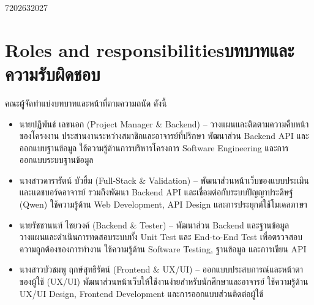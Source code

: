 \label{tab:ch1-plan}
\nopagebreak
\begin{plan}{7}{2026}{3}{2027}
\end{plan}

\section{\ifenglish Roles and responsibilities\else บทบาทและความรับผิดชอบ\fi}

คณะผู้จัดทำแบ่งบทบาทและหน้าที่ตามความถนัด ดังนี้

\begin{itemize}
  \item นายปฏิพันธ์ เลขนอก (Project Manager \& Backend) -- วางแผนและติดตามความคืบหน้าของโครงงาน ประสานงานระหว่างสมาชิกและอาจารย์ที่ปรึกษา พัฒนาส่วน Backend API และออกแบบฐานข้อมูล ใช้ความรู้ด้านการบริหารโครงการ Software Engineering และการออกแบบระบบฐานข้อมูล
  \item นางสาวดารารัตน์ บัวยิ้ม (Full-Stack \& Validation) -- พัฒนาส่วนหน้าเว็บของแบบประเมินและแดชบอร์ดอาจารย์ รวมถึงพัฒนา Backend API และเชื่อมต่อกับระบบปัญญาประดิษฐ์ (Qwen) ใช้ความรู้ด้าน Web Development, API Design และการประยุกต์ใช้โมเดลภาษา
  \item นายรัชชานนท์ ไชยวงค์ (Backend \& Tester) -- พัฒนาส่วน Backend และฐานข้อมูล วางแผนและดำเนินการทดสอบระบบทั้ง Unit Test และ End-to-End Test เพื่อตรวจสอบความถูกต้องของการทำงาน ใช้ความรู้ด้าน Software Testing, ฐานข้อมูล และการเขียน API
  \item นางสาวบัวชมพู ฤกษ์สุทธิรัตน์ (Frontend \& UX/UI) -- ออกแบบประสบการณ์และหน้าตาของผู้ใช้ (UX/UI) พัฒนาส่วนหน้าเว็บให้ใช้งานง่ายสำหรับนักศึกษาและอาจารย์ ใช้ความรู้ด้าน UX/UI Design, Frontend Development และการออกแบบส่วนติดต่อผู้ใช้
\end{itemize}


